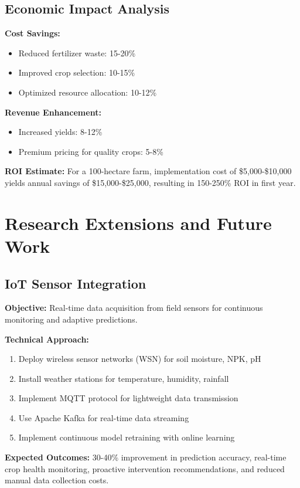 \documentclass[conference]{IEEEtran}
\begin{document}
\subsection{Economic Impact Analysis}
\textbf{Cost Savings:}
\begin{itemize}
    \item Reduced fertilizer waste: 15-20\%
    \item Improved crop selection: 10-15\%
    \item Optimized resource allocation: 10-12\%
\end{itemize}

\textbf{Revenue Enhancement:}
\begin{itemize}
    \item Increased yields: 8-12\%
    \item Premium pricing for quality crops: 5-8\%
\end{itemize}

\textbf{ROI Estimate:} For a 100-hectare farm, implementation cost of \$5,000-\$10,000 yields annual savings of \$15,000-\$25,000, resulting in 150-250\% ROI in first year.

\section{Research Extensions and Future Work}

\subsection{IoT Sensor Integration}
\textbf{Objective:} Real-time data acquisition from field sensors for continuous monitoring and adaptive predictions.

\textbf{Technical Approach:}
\begin{enumerate}
    \item Deploy wireless sensor networks (WSN) for soil moisture, NPK, pH
    \item Install weather stations for temperature, humidity, rainfall
    \item Implement MQTT protocol for lightweight data transmission
    \item Use Apache Kafka for real-time data streaming
    \item Implement continuous model retraining with online learning
\end{enumerate}

\textbf{Expected Outcomes:} 30-40\% improvement in prediction accuracy, real-time crop health monitoring, proactive intervention recommendations, and reduced manual data collection costs.
\end{document}
